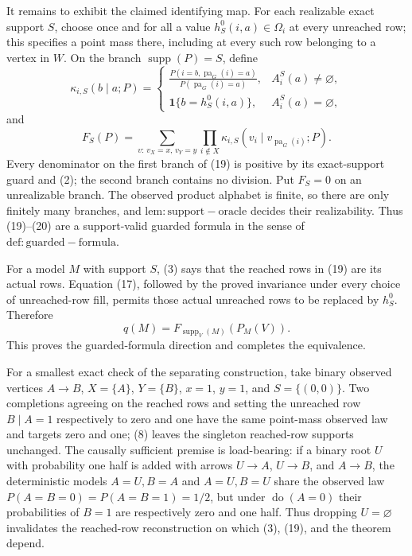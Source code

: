 It remains to exhibit the claimed identifying map.  For each realizable exact support \(S\), choose once and for all a value \(h_S^0(i,a)\in\Omega_i\) at every unreached row; this specifies a point mass there, including at every such row belonging to a vertex in \(W\).  On the branch \(\operatorname{supp}(P)=S\), define
\[
 \kappa_{i,S}(b\mid a;P)=
 \begin{cases}
 \displaystyle
 \frac{P(i=b,\operatorname{pa}_G(i)=a)}
 {P(\operatorname{pa}_G(i)=a)},
 &A_i^S(a)\neq\varnothing,\\[1.2ex]
 \mathbf 1\{b=h_S^0(i,a)\},
 &A_i^S(a)=\varnothing,
 \end{cases}
 \tag{19}
\]
and
\[
 F_S(P)=
 \sum_{v:\,v_X=x,\,v_Y=y}
 \prod_{i\notin X}
 \kappa_{i,S}(v_i\mid v_{\operatorname{pa}_G(i)};P).
 \tag{20}
\]
Every denominator on the first branch of (19) is positive by its exact-support guard and (2); the second branch contains no division.  Put \(F_S=0\) on an unrealizable branch.  The observed product alphabet is finite, so there are only finitely many branches, and \(\mathrm{lem:support-oracle}\) decides their realizability.  Thus (19)--(20) are a support-valid guarded formula in the sense of \(\mathrm{def:guarded-formula}\).

For a model \(M\) with support \(S\), (3) says that the reached rows in (19) are its actual rows.  Equation (17), followed by the proved invariance under every choice of unreached-row fill, permits those actual unreached rows to be replaced by \(h_S^0\).  Therefore
\[
 q(M)=F_{\operatorname{supp}_V(M)}(P_M(V)).
 \tag{21}
\]
This proves the guarded-formula direction and completes the equivalence.

For a smallest exact check of the separating construction, take binary observed vertices \(A\to B\), \(X=\{A\}\), \(Y=\{B\}\), \(x=1\), \(y=1\), and \(S=\{(0,0)\}\).  Two completions agreeing on the reached rows and setting the unreached row \(B\mid A=1\) respectively to zero and one have the same point-mass observed law and targets zero and one; (8) leaves the singleton reached-row supports unchanged.  The causally sufficient premise is load-bearing: if a binary root \(U\) with probability one half is added with arrows \(U\to A\), \(U\to B\), and \(A\to B\), the deterministic models \(A=U,B=A\) and \(A=U,B=U\) share the observed law \(P(A=B=0)=P(A=B=1)=1/2\), but under \(\operatorname{do}(A=0)\) their probabilities of \(B=1\) are respectively zero and one half.  Thus dropping \(U=\varnothing\) invalidates the reached-row reconstruction on which (3), (19), and the theorem depend.
